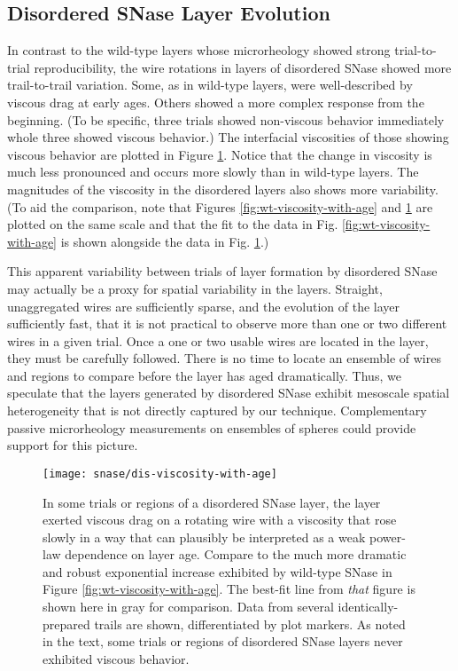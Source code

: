 \subsection{Disordered SNase Layer Evolution}

In contrast to the wild-type layers whose microrheology showed strong trial-to-trial reproducibility, the wire rotations in layers of disordered SNase showed more trail-to-trail variation. Some, as in wild-type layers, were well-described by viscous drag at early ages. Others showed a more complex response from the beginning. (To be specific, three trials showed non-viscous behavior immediately whole three showed viscous behavior.) The interfacial viscosities of those showing viscous behavior are plotted in Figure \ref{fig:dis-viscosity-with-age}. Notice that the change in viscosity is much less pronounced and occurs more slowly than in wild-type layers. The magnitudes of the viscosity in the disordered layers also shows more variability. (To aid the comparison, note that Figures \ref{fig:wt-viscosity-with-age} and \ref{fig:dis-viscosity-with-age} are plotted on the same scale and that the fit to the data in Fig. \ref{fig:wt-viscosity-with-age} is shown alongside the data in Fig. \ref{fig:dis-viscosity-with-age}.)

This apparent variability between trials of layer formation by disordered SNase may actually be a proxy for spatial variability in the layers. Straight, unaggregated wires are sufficiently sparse, and the evolution of the layer sufficiently fast, that it is not practical to observe more than one or two different wires in a given trial. Once a one or two usable wires are located in the layer, they must be carefully followed. There is no time to locate an ensemble of wires and regions to compare before the layer has aged dramatically. Thus, we speculate that the layers generated by disordered SNase exhibit mesoscale spatial heterogeneity that is not directly captured by our technique. Complementary passive microrheology measurements on ensembles of spheres could provide support for this picture.

   \begin{figure}
    \centering
    \texttt{[image: snase/dis-viscosity-with-age]}
    \caption{\label{fig:dis-viscosity-with-age}In some trials or regions of a disordered SNase layer, the layer exerted viscous drag on a rotating wire with a viscosity that rose slowly in a way that can plausibly be interpreted as a weak power-law dependence on layer age. Compare to the much more dramatic and robust exponential increase exhibited by wild-type SNase in Figure \ref{fig:wt-viscosity-with-age}. The best-fit line from \emph{that} figure is shown here in gray for comparison. Data from several identically-prepared trails are shown, differentiated by plot markers. As noted in the text, some trials or regions of disordered SNase layers never exhibited viscous behavior.}
    \end{figure}


